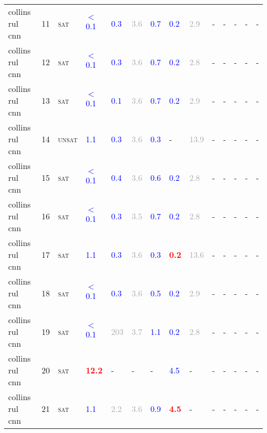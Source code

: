 \begin{center}
{\begin{longtable}{@{}llllllllllllll@{}}
collins rul cnn & 11 & \textsc{sat} & \textcolor{blue}{$<$0.1} & \textcolor{blue}{0.3} & \textcolor{darkgray}{3.6} & \textcolor{blue}{0.7} & \textcolor{blue}{0.2} & \textcolor{darkgray}{2.9} & - & - & - & - & - \\
collins rul cnn & 12 & \textsc{sat} & \textcolor{blue}{$<$0.1} & \textcolor{blue}{0.3} & \textcolor{darkgray}{3.6} & \textcolor{blue}{0.7} & \textcolor{blue}{0.2} & \textcolor{darkgray}{2.8} & - & - & - & - & - \\
collins rul cnn & 13 & \textsc{sat} & \textcolor{blue}{$<$0.1} & \textcolor{blue}{0.1} & \textcolor{darkgray}{3.6} & \textcolor{blue}{0.7} & \textcolor{blue}{0.2} & \textcolor{darkgray}{2.9} & - & - & - & - & - \\
collins rul cnn & 14 & \textsc{unsat} & \textcolor{blue}{1.1} & \textcolor{blue}{0.3} & \textcolor{darkgray}{3.6} & \textcolor{blue}{0.3} & - & \textcolor{darkgray}{13.9} & - & - & - & - & - \\
collins rul cnn & 15 & \textsc{sat} & \textcolor{blue}{$<$0.1} & \textcolor{blue}{0.4} & \textcolor{darkgray}{3.6} & \textcolor{blue}{0.6} & \textcolor{blue}{0.2} & \textcolor{darkgray}{2.8} & - & - & - & - & - \\
collins rul cnn & 16 & \textsc{sat} & \textcolor{blue}{$<$0.1} & \textcolor{blue}{0.3} & \textcolor{darkgray}{3.5} & \textcolor{blue}{0.7} & \textcolor{blue}{0.2} & \textcolor{darkgray}{2.8} & - & - & - & - & - \\
collins rul cnn & 17 & \textsc{sat} & \textcolor{blue}{1.1} & \textcolor{blue}{0.3} & \textcolor{darkgray}{3.6} & \textcolor{blue}{0.3} & \textbf{\textcolor{red}{0.2}} & \textcolor{darkgray}{13.6} & - & - & - & - & - \\
collins rul cnn & 18 & \textsc{sat} & \textcolor{blue}{$<$0.1} & \textcolor{blue}{0.3} & \textcolor{darkgray}{3.6} & \textcolor{blue}{0.5} & \textcolor{blue}{0.2} & \textcolor{darkgray}{2.9} & - & - & - & - & - \\
collins rul cnn & 19 & \textsc{sat} & \textcolor{blue}{$<$0.1} & \textcolor{darkgray}{203} & \textcolor{darkgray}{3.7} & \textcolor{blue}{1.1} & \textcolor{blue}{0.2} & \textcolor{darkgray}{2.8} & - & - & - & - & - \\
collins rul cnn & 20 & \textsc{sat} & \textbf{\textcolor{red}{12.2}} & - & - & - & \textcolor{blue}{4.5} & - & - & - & - & - & - \\
collins rul cnn & 21 & \textsc{sat} & \textcolor{blue}{1.1} & \textcolor{darkgray}{2.2} & \textcolor{darkgray}{3.6} & \textcolor{blue}{0.9} & \textbf{\textcolor{red}{4.5}} & - & - & - & - & - & - \\

\end{longtable}}
\end{center}
